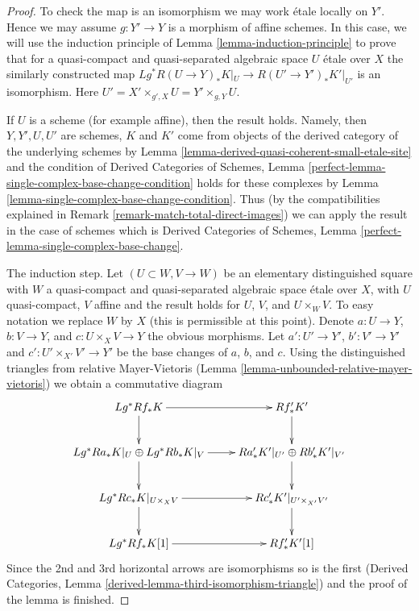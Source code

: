 \documentclass[10pt,a4paper]{amsart}
\theoremstyle{plain}
\theoremstyle{definition}
\theoremstyle{remark}
\numberwithin{equation}{subsection}
\begin{document}
\begin{proof}
To check the map is an isomorphism we may work \'etale locally on $Y'$.
Hence we may assume $g : Y' \to Y$ is a morphism of affine schemes.
In this case, we will use the induction principle of
Lemma \ref{lemma-induction-principle}
to prove that for a quasi-compact and quasi-separated
algebraic space $U$ \'etale over $X$
the similarly constructed map
$Lg^*R(U \to Y)_*K|_U \to R(U' \to Y')_*K'|_{U'}$
is an isomorphism. Here $U' = X' \times_{g', X} U = Y' \times_{g, Y} U$.

\medskip\noindent
If $U$ is a scheme (for example affine), then the result holds.
Namely, then $Y, Y', U, U'$ are schemes, $K$ and $K'$ come from
objects of the derived category of the underlying schemes by
Lemma \ref{lemma-derived-quasi-coherent-small-etale-site}
and the condition of
Derived Categories of Schemes,
Lemma \ref{perfect-lemma-single-complex-base-change-condition}
holds for these complexes by
Lemma \ref{lemma-single-complex-base-change-condition}.
Thus (by the compatibilities explained in
Remark \ref{remark-match-total-direct-images})
we can apply the result in the case of schemes
which is
Derived Categories of Schemes, Lemma
\ref{perfect-lemma-single-complex-base-change}.

\medskip\noindent
The induction step. Let $(U \subset W, V \to W)$ be an elementary
distinguished square with $W$ a quasi-compact and quasi-separated
algebraic space \'etale over $X$, with $U$ quasi-compact, $V$ affine
and the result holds for $U$, $V$, and $U \times_W V$.
To easy notation we replace $W$ by $X$ (this is permissible at this point).
Denote $a : U \to Y$, $b : V \to Y$, and $c : U \times_X V \to Y$
the obvious morphisms. Let $a' : U' \to Y'$, $b' : V' \to Y'$
and $c' : U' \times_{X'} V' \to Y'$ be the base changes of $a$, $b$, and $c$.
Using the distinguished triangles from relative Mayer-Vietoris
(Lemma \ref{lemma-unbounded-relative-mayer-vietoris})
we obtain a commutative diagram
$$
\xymatrix{
Lg^*Rf_*K \ar[r] \ar[d] & Rf'_*K' \ar[d] \\
Lg^*Ra_*K|_U \oplus Lg^*Rb_*K|_V \ar[r] \ar[d] &
Ra'_* K'|_{U'} \oplus Rb'_* K'|_{V'} \ar[d] \\
Lg^*Rc_*K|_{U \times_X V} \ar[r] \ar[d] &
Rc'_*K'|_{U' \times_{X'} V'} \ar[d] \\
Lg^*Rf_* K[1] \ar[r] &
Rf'_* K'[1]
}
$$
Since the 2nd and 3rd horizontal arrows are isomorphisms so is the first
(Derived Categories, Lemma \ref{derived-lemma-third-isomorphism-triangle})
and the proof of the lemma is finished.
\end{proof}
\end{document}
